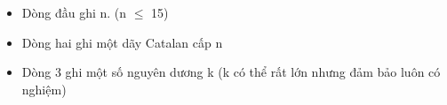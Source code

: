 \begin{itemize}
	\item Dòng đầu ghi n. (n  $\le$  15)
	\item Dòng hai ghi một dãy Catalan cấp n
	\item Dòng 3 ghi một số nguyên dương k (k có thể rất lớn nhưng đảm bảo luôn có nghiệm)
\end{itemize}

 

\